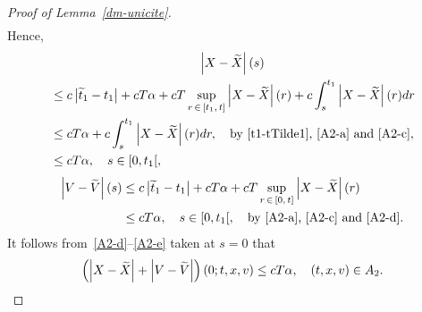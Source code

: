 \documentclass[AHL,Unicode,longabstracts,published]{cedram}
\let\oldtilde\tilde
\renewcommand*{\tilde}[1]{\mathchoice{\widetilde{#1}}{\widetilde{#1}}{\oldtilde{#1}}{\oldtilde{#1}}}
\begin{document}
\begin{proof}[{Proof of Lemma~\ref{dm-unicite}}]
\begin{align*}
\end{align*}
Hence,
\begin{multline}\label{A2-d}
\left|X-\tilde{X}\right|(s) \\
\begin{aligned}
&\leq c\left|\tilde{t}_1-t_1\right|+cT\alpha +cT\sup_{r\,\in\, \left[t_1,\,t\right]} \left|X-\tilde{X}\right|(r) + c\int_s^{t_1} \left|X-\tilde{X}\right|(r) dr \\
&\leq cT\alpha + c\int_s^{t_1} \left|X-\tilde{X}\right|(r) dr, \quad \text{by~\eqref{t1-tTilde1},~\eqref{A2-a} and~\eqref{A2-c}}, \\
&\leq cT\alpha, \quad s \in [0,t_1[, 
\end{aligned}
\end{multline}
\begin{equation}\label{A2-e}
\begin{split}
\left|V-\tilde{V}\right|(s) &\leq c\left|\tilde{t}_1-t_1\right|+cT\alpha +cT\sup_{r\,\in\,[0,\,t]} \left|X-\tilde{X}\right|(r) \\
&\leq cT\alpha, \quad s \in [0,t_1[, \quad \text{by~\eqref{A2-a}, \eqref{A2-c} and~\eqref{A2-d}}. 
\end{split}
\end{equation}
It follows from~\eqref{A2-d}--\eqref{A2-e} taken at $s=0$ that
\begin{equation}\label{A2-f}
\left (\left|X-\tilde{X}\right|+\left|V-\tilde{V}\right| \right) (0;t,x,v) \leq cT\alpha, \quad (t,x,v) \in A_2.
\end{equation}


\end{proof}
\end{document}
